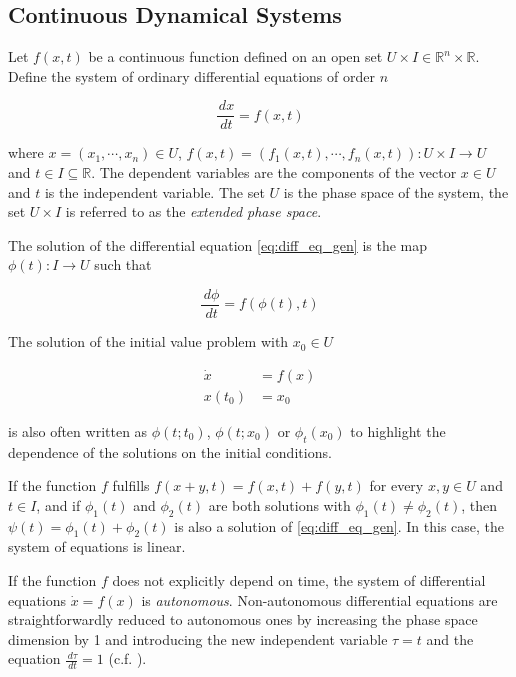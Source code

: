 \subsection{Continuous Dynamical Systems}

Let $f(x,t)$ be a continuous function defined on an open set $U \times I \in \mathbb{R}^n \times \mathbb{R}$. Define the system of ordinary differential equations of order $n$

\begin{equation}
    \frac{\,dx}{\,dt} = f(x, t)
    \label{eq:diff_eq_gen}
\end{equation}

where $x=(x_1, \cdots, x_n) \in U$, $f(x,t)=(f_1(x,t), \cdots, f_n(x,t)) : U \times I \rightarrow U$ and $t \in I \subseteq \mathbb{R}$. The dependent variables are the
components of the vector $x\in U$ and $t$ is the independent variable. The set $U$ is the phase space of the system, the set $U \times I$ is referred to as the 
\textit{extended phase space}.

The solution of the differential equation \ref{eq:diff_eq_gen} is the map
$\phi(t) : I \rightarrow U$ such that

\begin{equation}
    \frac{\,d \phi}{\, dt} = f(\phi(t), t)
\end{equation}

The solution of the initial value problem with $x_0 \in U$

\begin{align}
    \dot{x} &= f(x) \\
    x(t_0) &= x_0
\end{align}

is also often written as $\phi(t;t_0)$, $\phi(t;x_0)$ or $\phi_t(x_0)$ to highlight the dependence of the solutions on the 
initial conditions.

If the function $f$ fulfills $f(x+y,t) = f(x,t) + f(y, t)$ for every $x,y \in U$ and $t \in I$, and if $\phi_1(t)$ and $\phi_2(t)$ are both solutions with 
$\phi_1(t) \neq \phi_2(t)$, then $\psi(t) = \phi_1(t) + \phi_2(t)$ is also a solution of \ref{eq:diff_eq_gen}. In this case, the system of equations is linear.

If the function $f$ does not explicitly depend on time, the system of differential equations $\dot{x} = f(x)$ is \textit{autonomous}. Non-autonomous differential
equations are straightforwardly reduced to autonomous ones by increasing the phase space dimension by 1 and introducing the new independent variable $\tau = t$ and the 
equation $\frac{\,d\tau}{\,dt} = 1$ (c.f. \cite[p. 9]{strogatz2018nonlinear}).

